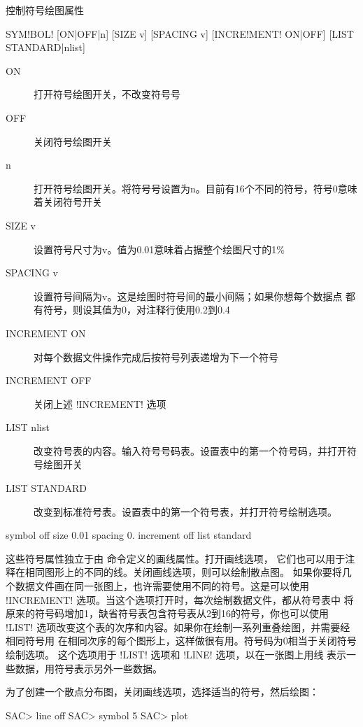 \label{cmd:symbol}

控制符号绘图属性

\begin{SACSTX}
SYM!BOL! [ON|OFF|n] [SIZE v] [SPACING v] [INCRE!MENT! ON|OFF] [LIST STANDARD|nlist]
\end{SACSTX}

\begin{description}
\item [ON] 打开符号绘图开关，不改变符号号
\item [OFF] 关闭符号绘图开关
\item [n] 打开符号绘图开关。将符号号设置为n。目前有16个不同的符号，符号0意味着关闭符号开关
\item [SIZE v] 设置符号尺寸为v。值为0.01意味着占据整个绘图尺寸的1\%
\item [SPACING v] 设置符号间隔为v。这是绘图时符号间的最小间隔；如果你想每个数据点
    都有符号，则设其值为0，对注释行使用0.2到0.4
\item [INCREMENT ON] 对每个数据文件操作完成后按符号列表递增为下一个符号
\item [INCREMENT OFF] 关闭上述 !INCREMENT! 选项
\item [LIST nlist] 改变符号表的内容。输入符号号码表。设置表中的第一个符号码，并打开符号绘图开关
\item [LIST STANDARD] 改变到标准符号表。设置表中的第一个符号表，并打开符号绘制选项。
\end{description}

\begin{SACDFT}
symbol off size 0.01 spacing 0. increment off list standard
\end{SACDFT}

这些符号属性独立于由  命令定义的画线属性。打开画线选项，
它们也可以用于注释在相同图形上的不同的线。关闭画线选项，则可以绘制散点图。
如果你要将几个数据文件画在同一张图上，也许需要使用不同的符号。这是可以使用
!INCREMENT! 选项。当这个选项打开时，每次绘制数据文件，都从符号表中
将原来的符号码增加1，缺省符号表包含符号表从2到16的符号，你也可以使用 !LIST!
选项改变这个表的次序和内容。如果你在绘制一系列重叠绘图，并需要经相同符号用
在相同次序的每个图形上，这样做很有用。符号码为0相当于关闭符号绘制选项。
这个选项用于 !LIST! 选项和 !LINE! 选项，以在一张图上用线
表示一些数据，用符号表示另外一些数据。

为了创建一个散点分布图，关闭画线选项，选择适当的符号，然后绘图：
\begin{SACCode}
SAC> line off
SAC> symbol 5
SAC> plot
\end{SACCode}

